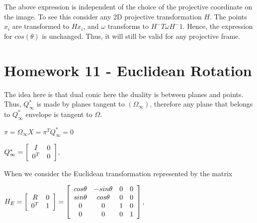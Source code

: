 \documentclass[]{article}
\begin{document}
\vspace{0.5em}

The above expression is independent of the choice of the projective coordinate on the image. To see this consider any 2D projective transformation $H$. The points $x_i$ are transformed to $Hx_i$, and $\omega$ transforms to $H^-T \omega H^-1$. Hence, the expression for $cos (\theta)$ is unchanged. Thus, it will still be valid for any projective frame. 


\section{Homework 11 - Euclidean Rotation}

The idea here is that dual conic here the duality is between planes and points. Thus, $Q_ \infty ^*$ is made by planes tangent to $(\Omega _ \infty)$, therefore any plane that belongs to $Q_ \infty ^*$ envelope is tangent to $\Omega$. 

\vspace{0.5em}

\centerline {
	$\pi = \Omega _ \infty X = \pi ^TQ_ \infty ^* = 0$ 
}

\vspace{0.5em}

\centerline {
	$Q_ \infty ^* = \left[ {\begin{array}{*{20}c}
		I & 0 \\
		0^T & 0   
		\end{array} } \right]$,
}

\vspace{0.5em}

When we consider the Euclidean transformation represented by the matrix 

\vspace{0.5em}

\centerline {
	$H_E = \left[ {\begin{array}{*{20}c}
		R & 0 \\
		0^T & 1   
		\end{array} } \right] =  \left[ {\begin{array}{*{20}c}
		cos \theta & -sin \theta & 0 & 0 \\
		sin \theta & cos \theta  & 0 & 0 \\ 
		0 & 0 & 1 & 0 \\ 
		0 & 0 & 0 & 1   
		\end{array} } \right] $,
}

\vspace{0.5em}
\end{document}
